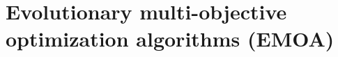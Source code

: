 %
%
%
%
%
%
%
%
%
%
%
%
%





\section{Evolutionary multi-objective optimization algorithms (EMOA)}


